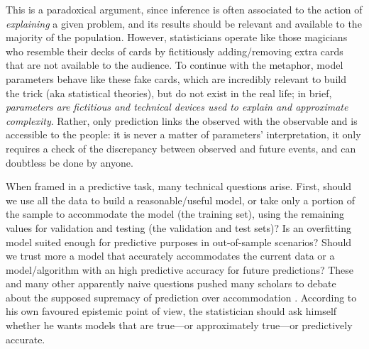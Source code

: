\documentclass{statsoc}
\begin{document}
This is a paradoxical argument, since inference is often associated to the action of \emph{explaining} a given problem, and its results should 
be relevant and available to the majority of the population. However, statisticians operate like those magicians who resemble their decks of cards 
by fictitiously adding/removing  extra cards that are not available to the audience. To continue with the metaphor,  model parameters behave like 
these fake cards, which are incredibly relevant to build the trick (aka statistical theories), but do not exist in the real life; in brief, 
\emph{parameters are  fictitious and technical devices used to explain and approximate  complexity}. Rather, only prediction links the observed with the observable and is accessible to the people: it is never a matter of 
parameters' interpretation, it only requires a check of the discrepancy between observed and future events, and can doubtless be done by anyone.  

When framed in a predictive task, many technical questions arise. First, should we use all the data to build a reasonable/useful model, or take only a portion of the 
sample to accommodate the model (the training set), using the remaining values for validation and testing (the validation and test sets)? Is 
an overfitting model suited enough for predictive purposes in out-of-sample scenarios? Should we trust more a model that accurately accommodates the 
current data or a model/algorithm with an high predictive accuracy for future predictions? These and many other apparently naive questions pushed many scholars to debate 
about the supposed supremacy of prediction over accommodation \citep{maher1988prediction, hitchcock2004prediction, worrall2014prediction}.  According to his own favoured epistemic point of view, the 
statistician should ask himself whether he wants models that are true---or  approximately true---or predictively accurate. 
\end{document}
